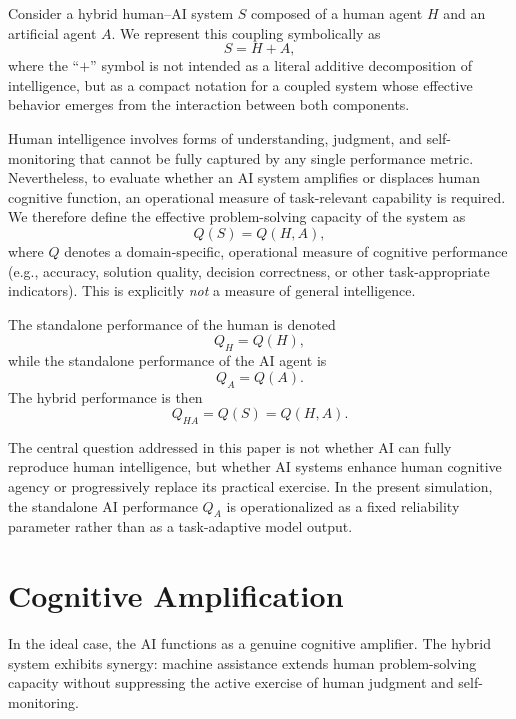 \documentclass[11pt,a4paper]{article}
\begin{document}
Consider a hybrid human--AI system $S$ composed of a human agent $H$ and an artificial agent $A$. We represent this coupling symbolically as
\begin{equation}
S = H + A,
\end{equation}
where the ``$+$'' symbol is not intended as a literal additive decomposition of intelligence, but as a compact notation for a coupled system whose effective behavior emerges from the interaction between both components.

Human intelligence involves forms of understanding, judgment, and self-monitoring that cannot be fully captured by any single performance metric. Nevertheless, to evaluate whether an AI system amplifies or displaces human cognitive function, an operational measure of task-relevant capability is required. We therefore define the effective problem-solving capacity of the system as
\begin{equation}
Q(S) = Q(H,A),
\end{equation}
where $Q$ denotes a domain-specific, operational measure of cognitive performance (e.g., accuracy, solution quality, decision correctness, or other task-appropriate indicators). This is explicitly \emph{not} a measure of general intelligence.

The standalone performance of the human is denoted
\begin{equation}
Q_H = Q(H),
\end{equation}
while the standalone performance of the AI agent is
\begin{equation}
Q_A = Q(A).
\end{equation}
The hybrid performance is then
\begin{equation}
Q_{HA} = Q(S) = Q(H,A).
\end{equation}

The central question addressed in this paper is not whether AI can fully reproduce human intelligence, but whether AI systems enhance human cognitive agency or progressively replace its practical exercise.
In the present simulation, the standalone AI performance $Q_A$ is operationalized as a fixed reliability parameter rather than as a task-adaptive model output.

\section{Cognitive Amplification}

In the ideal case, the AI functions as a genuine cognitive amplifier. The hybrid system exhibits synergy: machine assistance extends human problem-solving capacity without suppressing the active exercise of human judgment and self-monitoring.
\end{document}
